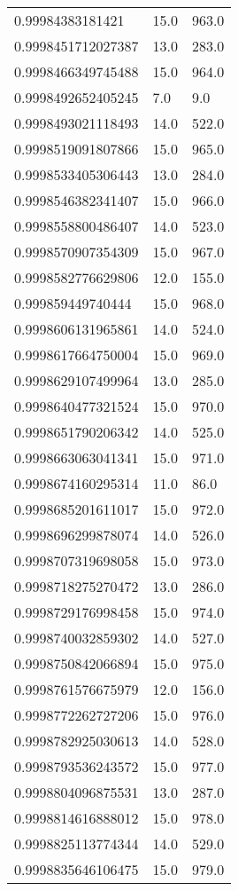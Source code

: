\begin{center}
\begin{supertabular}[H]{p{0.30\textwidth}p{0.05\textwidth}p{0.05\textwidth}}
0.99984383181421 & 15.0 & 963.0 \\ 
0.9998451712027387 & 13.0 & 283.0 \\ 
0.9998466349745488 & 15.0 & 964.0 \\ 
0.9998492652405245 & 7.0 & 9.0 \\ 
0.9998493021118493 & 14.0 & 522.0 \\ 
0.9998519091807866 & 15.0 & 965.0 \\ 
0.9998533405306443 & 13.0 & 284.0 \\ 
0.9998546382341407 & 15.0 & 966.0 \\ 
0.9998558800486407 & 14.0 & 523.0 \\ 
0.9998570907354309 & 15.0 & 967.0 \\ 
0.9998582776629806 & 12.0 & 155.0 \\ 
0.999859449740444 & 15.0 & 968.0 \\ 
0.9998606131965861 & 14.0 & 524.0 \\ 
0.9998617664750004 & 15.0 & 969.0 \\ 
0.9998629107499964 & 13.0 & 285.0 \\ 
0.9998640477321524 & 15.0 & 970.0 \\ 
0.9998651790206342 & 14.0 & 525.0 \\ 
0.9998663063041341 & 15.0 & 971.0 \\ 
0.9998674160295314 & 11.0 & 86.0 \\ 
0.9998685201611017 & 15.0 & 972.0 \\ 
0.9998696299878074 & 14.0 & 526.0 \\ 
0.9998707319698058 & 15.0 & 973.0 \\ 
0.9998718275270472 & 13.0 & 286.0 \\ 
0.9998729176998458 & 15.0 & 974.0 \\ 
0.9998740032859302 & 14.0 & 527.0 \\ 
0.9998750842066894 & 15.0 & 975.0 \\ 
0.9998761576675979 & 12.0 & 156.0 \\ 
0.9998772262727206 & 15.0 & 976.0 \\ 
0.9998782925030613 & 14.0 & 528.0 \\ 
0.9998793536243572 & 15.0 & 977.0 \\ 
0.9998804096875531 & 13.0 & 287.0 \\ 
0.9998814616888012 & 15.0 & 978.0 \\ 
0.9998825113774344 & 14.0 & 529.0 \\ 
0.9998835646106475 & 15.0 & 979.0 \\ 

\end{supertabular}
\end{center}
